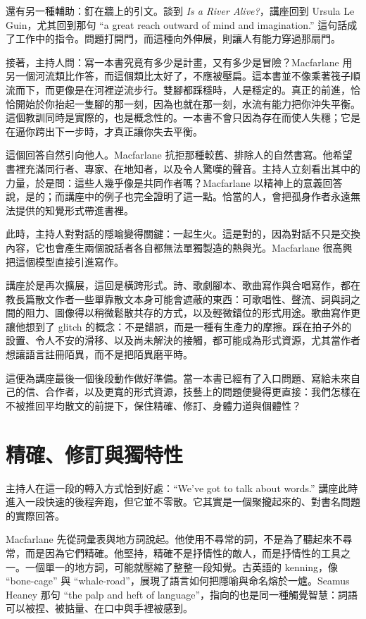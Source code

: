 還有另一種輔助：釘在牆上的引文。談到 \emph{Is a River Alive?}，講座回到 Ursula Le Guin，尤其回到那句 ``a great reach outward of mind and imagination.'' 這句話成了工作中的指令。問題打開門，而這種向外伸展，則讓人有能力穿過那扇門。

接著，主持人問：寫一本書究竟有多少是計畫，又有多少是冒險？Macfarlane 用另一個河流類比作答，而這個類比太好了，不應被壓扁。這本書並不像乘著筏子順流而下，而更像是在河裡逆流步行。雙腳都踩穩時，人是穩定的。真正的前進，恰恰開始於你抬起一隻腳的那一刻，因為也就在那一刻，水流有能力把你沖失平衡。這個教訓同時是實際的，也是概念性的。一本書不會只因為存在而使人失穩；它是在逼你跨出下一步時，才真正讓你失去平衡。

這個回答自然引向他人。Macfarlane 抗拒那種較舊、排除人的自然書寫。他希望書裡充滿同行者、專家、在地知者，以及令人驚嘆的聲音。主持人立刻看出其中的力量，於是問：這些人幾乎像是共同作者嗎？Macfarlane 以精神上的意義回答說，是的；而講座中的例子也完全證明了這一點。恰當的人，會把孤身作者永遠無法提供的知覺形式帶進書裡。

此時，主持人對對話的隱喻變得關鍵：一起生火。這是對的，因為對話不只是交換內容，它也會產生兩個說話者各自都無法單獨製造的熱與光。Macfarlane 很高興把這個模型直接引進寫作。

講座於是再次擴展，這回是橫跨形式。詩、歌劇腳本、歌曲寫作與合唱寫作，都在教長篇散文作者一些單靠散文本身可能會遮蔽的東西：可歌唱性、聲流、詞與詞之間的阻力、圖像得以稍微鬆散共存的方式，以及輕微錯位的形式用途。歌曲寫作更讓他想到了 glitch 的概念：不是錯誤，而是一種有生產力的摩擦。踩在拍子外的設置、令人不安的滑移、以及尚未解決的接觸，都可能成為形式資源，尤其當作者想讓語言註冊陌異，而不是把陌異磨平時。

這便為講座最後一個後段動作做好準備。當一本書已經有了入口問題、寫給未來自己的信、合作者，以及更寬的形式資源，技藝上的問題便變得更直接：我們怎樣在不被推回平均散文的前提下，保住精確、修訂、身體力道與個體性？

\section{精確、修訂與獨特性}

主持人在這一段的轉入方式恰到好處：``We've got to talk about words.'' 講座此時進入一段快速的後程奔跑，但它並不零散。它其實是一個聚攏起來的、對書名問題的實際回答。

Macfarlane 先從詞彙表與地方詞說起。他使用不尋常的詞，不是為了聽起來不尋常，而是因為它們精確。他堅持，精確不是抒情性的敵人，而是抒情性的工具之一。一個單一的地方詞，可能就壓縮了整整一段知覺。古英語的 kenning，像 ``bone-cage'' 與 ``whale-road''，展現了語言如何把隱喻與命名熔於一爐。Seamus Heaney 那句 ``the palp and heft of language''，指向的也是同一種觸覺智慧：詞語可以被捏、被掂量、在口中與手裡被感到。

